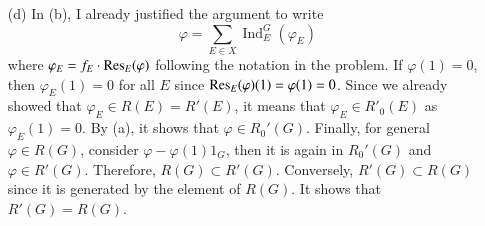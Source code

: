 \documentclass[a4paper, 12pt]{article}
\theoremstyle{Mydefinition}
\theoremstyle{Mytheorem}
\newtheorem{proposition}[statement]{Proposition}
\DeclareMathOperator{\Ind}{Ind}
\begin{document}
\begin{enumerate}
    Now, I'll prove a proposition
    \begin{proposition}
        If $G$ is an elementary group, then $R(G)=R'(G)$.
    \end{proposition}
    \begin{proof}
    Let's use induction on $\abs{G}$. If $\abs{G}=1$, then it is trivial, so let's assume that the statement is true for $\abs{G}<n$ for some $n\in\mathbb{N}_{\geq 2}$. It is enough to show that $R(G)\subset R'(G)$. Since $[G:H]$ is prime order, it is abelian, cf. \textit{Abstract Algebra}, Dummit and Foote, Section 4.3 theorem 8, so we can apply (b). By induction, we know that $R(H)=R'(H)$ since $H$ are all proper elementary subgroup of $G$, so $\Ind_H^G(R(H))\subset R'(G)$. Since $G$ is an elementary subgroup, by setting $E=G$ in the generating element $\Ind_E^G(\alpha-1_E)$ of $R'_0(G)$ with $1_G$, we know that any degree 1 character of $G$ is contained in $R'(G)$. Therefore, it shows that $R(G)\subset R'(G)$ and we get $R(G)=R'(G)$.
    \end{proof}
    \item[(d)] In (b), I already justified the argument to write
    \begin{equation}
        \varphi = \sum_{E\in X} \Ind_E^G(\varphi_E)
    \end{equation}
    where $\varphi_E = f_E\cdot \Res_E(\varphi)$ following the notation in the problem. If $\varphi(1)=0$, then $\varphi_E(1)=0$ for all $E$ since $\Res_E(\varphi)(1) = \varphi(1)=0$. Since we already showed that $\varphi_E\in R(E) = R'(E)$, it means that $\varphi_E\in R'_0(E)$ as $\varphi_E(1)=0$. By (a), it shows that $\varphi\in R_0'(G)$. Finally, for general $\varphi\in R(G)$, consider $\varphi-\varphi(1)1_G$, then it is again in $R_0'(G)$ and $\varphi\in R'(G)$. Therefore, $R(G)\subset R'(G)$. Conversely, $R'(G)\subset R(G)$ since it is generated by the element of $R(G)$. It shows that $R'(G)=R(G)$.
\end{enumerate}
\end{document}
